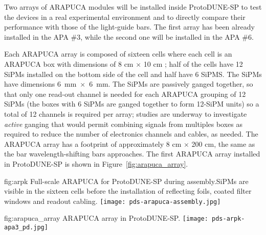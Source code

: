 Two arrays of ARAPUCA modules will be installed inside ProtoDUNE-SP to test the devices in a real experimental environment and to directly compare their performance with those of the light-guide bars. The first array has been already installed in the APA \#3, while the second one will be installed in the APA \#6.
 
Each ARAPUCA array is composed of sixteen cells where each cell is an ARAPUCA box with dimensions of 8 cm $\times$ 10 cm ; half of the cells have \num{12} SiPMs installed on the bottom side of the cell and  half have \num{6} SiPMS. The SiPMs have dimensions \SI{6}{mm}~$\times$~\SI{6}{mm}.
The SiPMs  are passively ganged together, so that only one read-out channel is needed for each ARAPUCA grouping of 12 SiPMs (the boxes with 6 SiPMs are ganged together to form 12-SiPM units) so a total of 12 channels is required per array; studies are underway to investigate {\it active} ganging that would permit combining signals from multiples boxes as required to reduce the number of electronics channels and cables, as needed. 
The ARAPUCA array has a footprint of approximately 8 cm $\times$ 200 cm, the same as the bar wavelength-shifting bars approaches. 
The first ARAPUCA array installed in ProtoDUNE-SP is shown in Figure~\ref{fig:arapuca_array}.


\begin{dunefigure}{fig:arpk}
{Full-scale ARAPUCA for ProtoDUNE-SP during assembly.SiPMs are visible in the sixteen cells before the installation of reflecting foils, coated filter windows and readout cabling. } 
\texttt{[image: pds-arapuca-assembly.jpg]}
\end{dunefigure}

\begin{dunefigure}{fig:arapuca_array}
{ARAPUCA array in ProtoDUNE-SP.} 	
\texttt{[image: pds-arpk-apa3\_pd.jpg]} 
\end{dunefigure}

